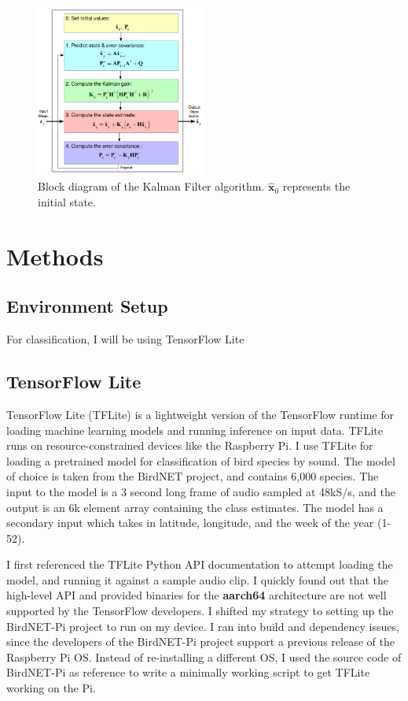 \documentclass[12pt]{article}
\begin{document}
\begin{figure}[h]
\centering
\includegraphics[width=0.5\textwidth]{kimkalman.png} %
\caption{Block diagram of the Kalman Filter algorithm. $\hat{\mathbf{x}}_0$ represents the initial state.}
\label{fig:kimkalman}
\end{figure}

\section{Methods}\label{sec:methods}

\subsection{Environment Setup}

	For classification, I will be using TensorFlow Lite
	
\subsection{TensorFlow Lite}
	TensorFlow Lite (TFLite) is a lightweight version of the TensorFlow runtime for loading machine learning models and running inference on input data. TFLite runs on resource-constrained devices like the Raspberry Pi. I use TFLite for loading a pretrained model for classification of bird species by sound. The model of choice is taken from the BirdNET project, and contains 6,000 species. The input to the model is a 3 second long frame of audio sampled at 48kS/s, and the output is an 6k element array containing the class estimates. The model has a secondary input which takes in latitude, longitude, and the week of the year (1-52).
	
	I first referenced the TFLite Python API documentation to attempt loading the model, and running it against a sample audio clip. I quickly found out that the high-level API and provided binaries for the \textbf{aarch64} architecture are not well supported by the TensorFlow developers. I shifted my strategy to setting up the BirdNET-Pi project to run on my device. I ran into build and dependency issues, since the developers of the BirdNET-Pi project support a previous release of the Raspberry Pi OS. Instead of re-installing a different OS, I used the source code of BirdNET-Pi as reference to write a minimally working script to get TFLite working on the Pi.
	
\end{document}
